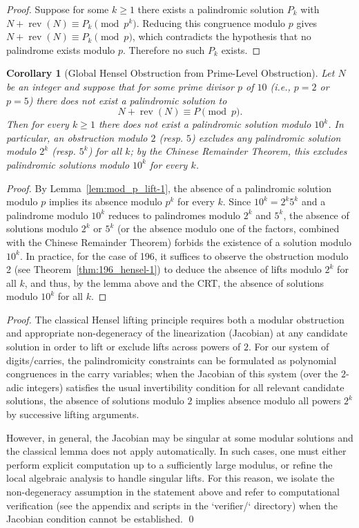 \documentclass[12pt,a4paper]{article}
\newtheorem{corollary}[theorem]{Corollary}
\begin{document}
\begin{proof}
Suppose for some $k\ge1$ there exists a palindromic solution $P_k$ with
$N+\operatorname{rev}(N)\equiv P_k\pmod{p^k}$. Reducing this congruence modulo $p$ gives
$N+\operatorname{rev}(N)\equiv P_k\pmod p$, which contradicts the hypothesis that no palindrome exists modulo $p$. Therefore no such $P_k$ exists.
\end{proof}

\begin{corollary}[Global Hensel Obstruction from Prime-Level Obstruction]\label{cor:prime_to_power-7}
Let $N$ be an integer and suppose that for some prime divisor $p$ of $10$ (i.e., $p=2$ or $p=5$) there does not exist a palindromic solution to
\[
N+\operatorname{rev}(N) \equiv P \pmod p.
\]
Then for every $k \ge 1$ there does not exist a palindromic solution modulo $10^k$. In particular, an obstruction modulo $2$ (resp. $5$) excludes any palindromic solution modulo $2^k$ (resp. $5^k$) for all $k$; by the Chinese Remainder Theorem, this excludes palindromic solutions modulo $10^k$ for every $k$.
\end{corollary}

\begin{proof}
By Lemma~\ref{lem:mod_p_lift-1}, the absence of a palindromic solution modulo $p$ implies its absence modulo $p^k$ for every $k$. Since $10^k = 2^k 5^k$ and a palindrome modulo $10^k$ reduces to palindromes modulo $2^k$ and $5^k$, the absence of solutions modulo $2^k$ or $5^k$ (or the absence modulo one of the factors, combined with the Chinese Remainder Theorem) forbids the existence of a solution modulo $10^k$. In practice, for the case of 196, it suffices to observe the obstruction modulo 2 (see Theorem~\ref{thm:196_hensel-1}) to deduce the absence of lifts modulo $2^k$ for all $k$, and thus, by the lemma above and the CRT, the absence of solutions modulo $10^k$ for all $k$.
\end{proof}

\begin{proof}
The classical Hensel lifting principle requires both a modular obstruction and appropriate non-degeneracy of the linearization (Jacobian) at any candidate solution in order to lift or exclude lifts across powers of $2$. For our system of digits/carries, the palindromicity constraints can be formulated as polynomial congruences in the carry variables; when the Jacobian of this system (over the $2$-adic integers) satisfies the usual invertibility condition for all relevant candidate solutions, the absence of solutions modulo $2$ implies absence modulo all powers $2^k$ by successive lifting arguments.

However, in general, the Jacobian may be singular at some modular solutions and the classical lemma does not apply automatically. In such cases, one must either perform explicit computation up to a sufficiently large modulus, or refine the local algebraic analysis to handle singular lifts. For this reason, we isolate the non-degeneracy assumption in the statement above and refer to computational verification (see the appendix and scripts in the `verifier/` directory) when the Jacobian condition cannot be established.
\qed
\end{proof}
\end{document}
